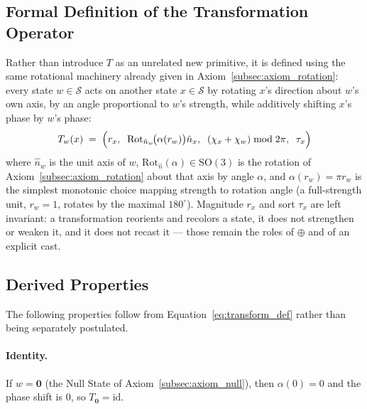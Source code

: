 \documentclass[12pt, a4paper]{article}
\begin{document}
\subsection{Formal Definition of the Transformation Operator}
\label{subsec:transform_definition}
Rather than introduce $T$ as an unrelated new primitive, it is defined
using the same rotational machinery already given in
Axiom~\ref{subsec:axiom_rotation}: every state $w \in \mathcal{S}$
acts on another state $x \in \mathcal{S}$ by rotating $x$'s direction
about $w$'s own axis, by an angle proportional to $w$'s strength, while
additively shifting $x$'s phase by $w$'s phase:
\begin{equation}
    T_w(x)
    \;=\;
    \Bigl(
        r_x,\;\;
        \mathrm{Rot}_{\hat n_w}\!\bigl(\alpha(r_w)\bigr)\hat n_x,\;\;
        (\chi_x + \chi_w) \bmod 2\pi,\;\;
        \tau_x
    \Bigr)
    \label{eq:transform_def}
\end{equation}
where $\hat n_w$ is the unit axis of $w$,
$\mathrm{Rot}_{\hat n}(\alpha) \in \mathrm{SO}(3)$ is the
rotation of Axiom~\ref{subsec:axiom_rotation} about that axis by angle
$\alpha$, and $\alpha(r_w) = \pi r_w$ is the simplest monotonic choice
mapping strength to rotation angle (a full-strength unit, $r_w = 1$,
rotates by the maximal $180^\circ$). Magnitude $r_x$ and sort $\tau_x$ are left invariant:
a transformation reorients and recolors a state, it does not
strengthen or weaken it, and it does not recast it --- those remain
the roles of $\oplus$ and of an explicit cast.

\subsection{Derived Properties}
\label{subsec:transform_properties}
The following properties follow from Equation~\eqref{eq:transform_def}
rather than being separately postulated.

\paragraph{Identity.} If $w = \mathbf{0}$ (the Null State of
Axiom~\ref{subsec:axiom_null}), then $\alpha(0) = 0$ and the phase
shift is $0$, so $T_{\mathbf{0}} = \mathrm{id}$.
\end{document}

